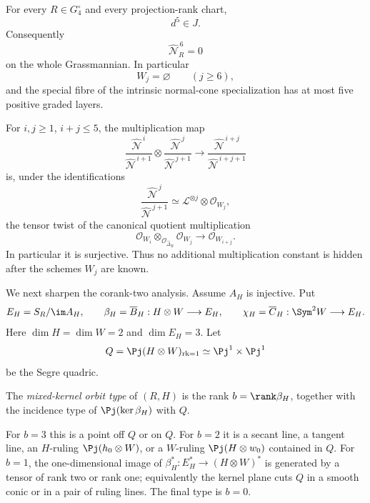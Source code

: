 \begin{theorem}
\label{thm:finite-all-corank-depth}
For every \(R\in G_4^\circ\) and every projection-rank chart,
\begin{equation}\label{eq:d5-in-J}
 d^5\in J.
\end{equation}
Consequently
\[
 \widehat{\mathcal N}_R^{\,6}=0
\]
on the whole Grassmannian.  In particular
\[
 W_j=\varnothing\qquad(j\ge6),
\]
and the special fibre of the intrinsic normal-cone specialization has
at most five positive graded layers.

For \(i,j\ge1\), \(i+j\le5\), the multiplication map
\[
 \frac{\widehat{\mathcal N}^{\,i}}
      {\widehat{\mathcal N}^{\,i+1}}
 \otimes
 \frac{\widehat{\mathcal N}^{\,j}}
      {\widehat{\mathcal N}^{\,j+1}}
 \longrightarrow
 \frac{\widehat{\mathcal N}^{\,i+j}}
      {\widehat{\mathcal N}^{\,i+j+1}}
\]
is, under the identifications
\[
 \frac{\widehat{\mathcal N}^{\,j}}
      {\widehat{\mathcal N}^{\,j+1}}
 \simeq
 \mathcal L^{\otimes j}\otimes\mathcal O_{W_j},
\]
the tensor twist of the canonical quotient multiplication
\begin{equation}\label{eq:atlas-multiplication}
 \mathcal O_{W_i}\otimes_{\mathcal O_{\widehat\Delta_R}}
 \mathcal O_{W_j}
 \longrightarrow
 \mathcal O_{W_{i+j}}.
\end{equation}
In particular it is surjective.  Thus no additional multiplication
constant is hidden after the schemes \(W_j\) are known.
\end{theorem}

We next sharpen the corank-two analysis.  Assume \(A_H\) is
injective.  Put
\[
 E_H=S_R/\im A_H,\qquad
 \beta_H=\overline B_H:H\otimes W\longrightarrow E_H,\qquad
 \chi_H=\overline C_H:\Sym^2W\longrightarrow E_H.
\]
Here \(\dim H=\dim W=2\) and \(\dim E_H=3\).  Let
\[
 Q=\Pj(H\otimes W)_{\operatorname{rk}=1}
   \simeq\Pj^1\times\Pj^1
\]
be the Segre quadric.

\begin{definition}
\label{def:mixed-kernel-orbit-type}
The \emph{mixed-kernel orbit type} of \((R,H)\) is the rank
\(b=\rank\beta_H\), together with the incidence type of
\(\Pj(\ker\beta_H)\) with \(Q\).

For \(b=3\) this is a point off \(Q\) or on \(Q\).  For \(b=2\)
it is a secant line, a tangent line, an \(H\)-ruling
\(\Pj(h_0\otimes W)\), or a \(W\)-ruling
\(\Pj(H\otimes w_0)\) contained in \(Q\).  For \(b=1\), the one-dimensional image of
\(\beta_H^*:E_H^*\to(H\otimes W)^*\) is generated by a tensor of
rank two or rank one; equivalently the kernel plane cuts \(Q\) in a
smooth conic or in a pair of ruling lines.  The final type is
\(b=0\).
\end{definition}

